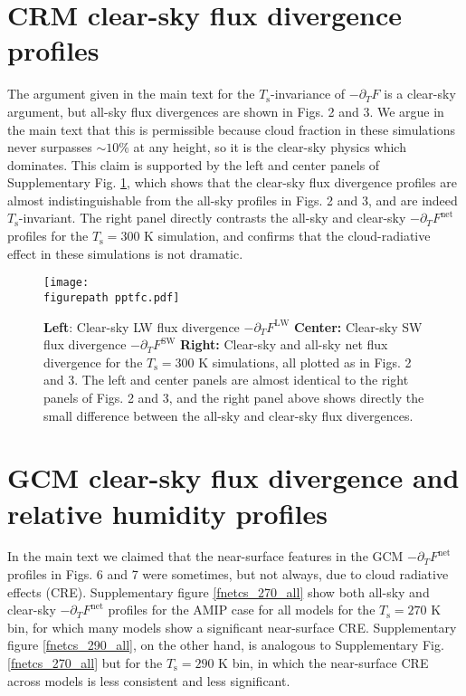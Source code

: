 \documentclass[11pt]{article}
\newcommand{\ppt}{\ensuremath{\partial_T}}
\newcommand{\FLW}{\ensuremath{F^\mathrm{LW}}}
\newcommand{\FSW}{\ensuremath{F^\mathrm{SW}}}
\newcommand{\Fnet}{\ensuremath{F^\mathrm{net}}}
\newcommand{\Ts}{\ensuremath{T_\mathrm{s}}}
\newcommand{\figurepath}{../../figures/}
\begin{document}
\section{CRM clear-sky flux divergence profiles}
The argument given in the main text for the \Ts-invariance of $-\ppt F$ is a clear-sky argument, but all-sky flux divergences are shown in Figs. 2 and 3. We argue in the main text that this is permissible because cloud fraction in these simulations never surpasses $\sim 10 \%$ at any height, so it is the clear-sky physics which dominates. This claim is supported by the left and center panels of Supplementary Fig. \ref{pptfc}, which shows that the clear-sky flux divergence profiles are almost indistinguishable from the all-sky profiles in Figs. 2 and 3, and are indeed  \Ts-invariant. The right panel directly contrasts the all-sky and clear-sky $-\ppt \Fnet$ profiles for the $\Ts=300$ K simulation, and confirms that the cloud-radiative effect in these simulations is not dramatic. 

\begin{figure}[h]
        \begin{center}
                        \texttt{[image: \\figurepath pptfc.pdf]}
                \caption{\textbf{Left}: Clear-sky LW flux divergence  $-\ppt \FLW$ \textbf{Center:} Clear-sky SW flux divergence  $-\ppt \FSW$  \textbf{Right:} Clear-sky and all-sky  net flux divergence for the $\Ts=300$ K simulations, all plotted as in Figs. 2 and 3. The left and center panels are almost identical to the right panels of Figs. 2 and 3, and the right panel above shows directly the small difference between the all-sky and clear-sky flux divergences. 
                \label{pptfc}
                }
        \end{center}
\end{figure}



\section{GCM clear-sky flux divergence and relative humidity profiles}
In the main text we claimed that the near-surface features in the GCM $-\ppt\Fnet$ profiles in Figs. 6 and 7 were sometimes, but not always, due to cloud radiative effects (CRE). Supplementary figure \ref{fnetcs_270_all} show both all-sky and clear-sky $-\ppt\Fnet$ profiles for the AMIP case for all models for the $\Ts=270$ K bin, for which many models show a significant near-surface CRE. Supplementary figure \ref{fnetcs_290_all}, on the other hand, is analogous to Supplementary Fig. \ref{fnetcs_270_all} but for the $\Ts=290$ K bin, in which the near-surface CRE across models is less consistent and  less significant. 
\end{document}
